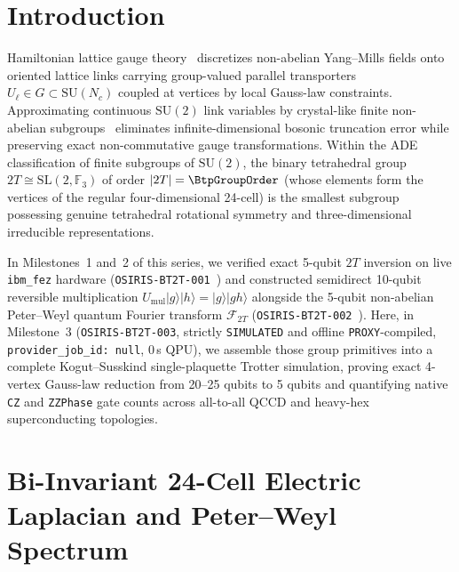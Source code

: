 \documentclass[twocolumn,aps,prapplied,superscriptaddress,floatfix]{revtex4-2}
\begin{document}
\maketitle

\section{Introduction}\label{sec:intro}

Hamiltonian lattice gauge theory~\cite{kogut1975,zohar2016} discretizes non-abelian Yang--Mills fields onto oriented lattice links carrying group-valued parallel transporters $U_\ell \in G \subset \mathrm{SU}(N_c)$ coupled at vertices by local Gauss-law constraints. Approximating continuous $\mathrm{SU}(2)$ link variables by crystal-like finite non-abelian subgroups~\cite{lang1982,lamm2019,alam2022} eliminates infinite-dimensional bosonic truncation error while preserving exact non-commutative gauge transformations. Within the ADE classification of finite subgroups of $\mathrm{SU}(2)$, the binary tetrahedral group $2T \cong \mathrm{SL}(2, \mathbb{F}_3)$ of order $|2T| = \BtpGroupOrder$ (whose elements form the vertices of the regular four-dimensional 24-cell) is the smallest subgroup possessing genuine tetrahedral rotational symmetry and three-dimensional irreducible representations.

In Milestones~1 and~2 of this series, we verified exact 5-qubit $2T$ inversion on live \texttt{ibm\_fez} hardware (\texttt{OSIRIS-BT2T-001}~\cite{davis_bt2t001}) and constructed semidirect 10-qubit reversible multiplication $U_{\mathrm{mul}}|g\rangle|h\rangle = |g\rangle|gh\rangle$ alongside the 5-qubit non-abelian Peter--Weyl quantum Fourier transform $\mathcal{F}_{2T}$ (\texttt{OSIRIS-BT2T-002}~\cite{davis_bt2t002}). Here, in Milestone~3 (\texttt{OSIRIS-BT2T-003}, strictly \texttt{SIMULATED} and offline \texttt{PROXY}-compiled, \texttt{provider\_job\_id: null}, 0\,s QPU), we assemble those group primitives into a complete Kogut--Susskind single-plaquette Trotter simulation, proving exact 4-vertex Gauss-law reduction from 20--25 qubits to 5 qubits and quantifying native \texttt{CZ} and \texttt{ZZPhase} gate counts across all-to-all QCCD and heavy-hex superconducting topologies.

\section{Bi-Invariant 24-Cell Electric Laplacian and Peter--Weyl Spectrum}\label{sec:hamiltonian}
\end{document}

